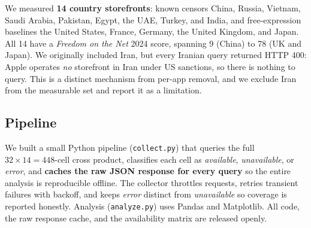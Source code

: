 We measured \textbf{14 country storefronts}: known censors China, Russia, Vietnam,
Saudi Arabia, Pakistan, Egypt, the UAE, Turkey, and India, and free-expression
baselines the United States, France, Germany, the United Kingdom, and Japan. All 14
have a \emph{Freedom on the Net} 2024 score, spanning 9 (China) to 78 (UK and
Japan). We originally included Iran, but every Iranian query returned HTTP 400:
Apple operates \emph{no} storefront in Iran under US sanctions, so there is nothing
to query. This is a distinct mechanism from per-app removal, and we exclude Iran
from the measurable set and report it as a limitation.

\subsection{Pipeline}

We built a small Python pipeline (\texttt{collect.py}) that queries the full
$32 \times 14 = 448$-cell cross product, classifies each cell as \emph{available},
\emph{unavailable}, or \emph{error}, and \textbf{caches the raw JSON response for
every query} so the entire analysis is reproducible offline. The collector throttles
requests, retries transient failures with backoff, and keeps \emph{error} distinct
from \emph{unavailable} so coverage is reported honestly. Analysis
(\texttt{analyze.py}) uses Pandas and Matplotlib. All code, the raw response cache,
and the availability matrix are released openly.
